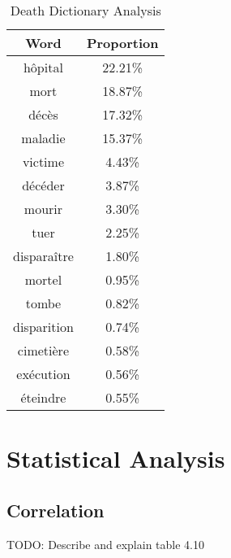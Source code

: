 \begin{table}[]
\caption{Death Dictionary Analysis}
\label{tab:death freqs}
\centering
\begin{tabular}{@{}cc@{}}
\toprule
Word      & Proportion \\ \midrule
hôpital     & 22.21\% \\
mort        & 18.87\% \\
décès       & 17.32\% \\
maladie     & 15.37\% \\
victime     & 4.43\%  \\
décéder     & 3.87\%  \\
mourir      & 3.30\%  \\
tuer        & 2.25\%  \\
disparaître & 1.80\%  \\
mortel      & 0.95\%  \\
tombe       & 0.82\%  \\
disparition & 0.74\%  \\
cimetière   & 0.58\%  \\
exécution   & 0.56\%  \\
éteindre    & 0.55\%  \\ \bottomrule
\end{tabular}
\end{table}

\section{Statistical Analysis}

\subsection{Correlation}

TODO: Describe and explain table 4.10

